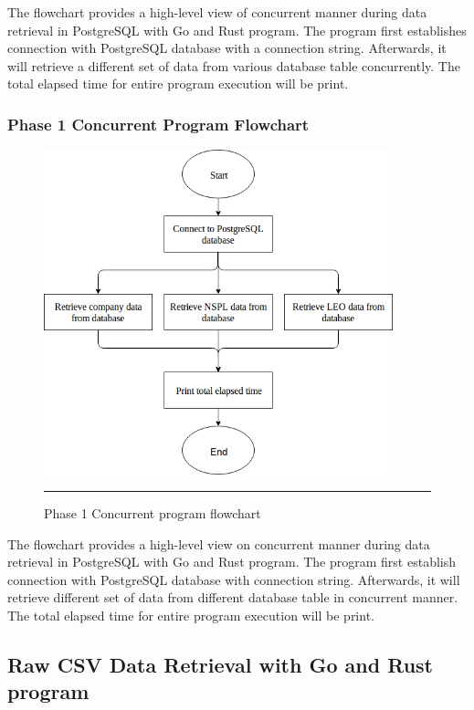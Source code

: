 The flowchart provides a high-level view of concurrent manner during data retrieval in PostgreSQL with Go and Rust program. The program first establishes connection with PostgreSQL database with a connection string. Afterwards, it will retrieve a different set of data from various database table concurrently. The total elapsed time for entire program execution will be print.

\subsubsection{Phase 1 Concurrent Program Flowchart}

\begin{figure}[H]
	\centering
	\includegraphics[width=0.9\textwidth]{Figure/postgres-data-concurrent.png}
	\rule{35em}{0.5pt}
	\caption[Phase 1 Concurrent program flowchart]{Phase 1 Concurrent program flowchart}
\end{figure}

The flowchart provides a high-level view on concurrent manner during data retrieval in PostgreSQL with Go and Rust program. The program first establish connection with PostgreSQL database with connection string. Afterwards, it will retrieve different set of data from different database table in concurrent manner. The total elapsed time for entire program execution will be print. 

\subsection{Raw CSV Data Retrieval with Go and Rust program}

